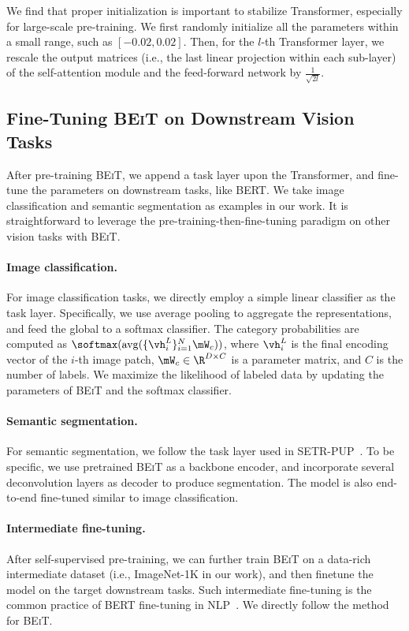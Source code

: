 \documentclass{article}
\newcommand\our{\textsc{BEiT}}
\begin{document}
We find that proper initialization is important to stabilize Transformer, especially for large-scale pre-training.
We first randomly initialize all the parameters within a small range, such as $[-0.02, 0.02]$.
Then, for the $l$-th Transformer layer, we rescale the output matrices (i.e., the last linear projection within each sub-layer) of the self-attention module and the feed-forward network by $\frac{1}{\sqrt{2l}}$.


\subsection{Fine-Tuning \our{} on Downstream Vision Tasks}
\label{sec:ft}

After pre-training \our{}, we append a task layer upon the Transformer, and fine-tune the parameters on downstream tasks, like BERT.
We take image classification and semantic segmentation as examples in our work.
It is straightforward to leverage the pre-training-then-fine-tuning paradigm on other vision tasks with \our{}.

\paragraph{Image classification.}
For image classification tasks, we directly employ a simple linear classifier as the task layer.
Specifically, we use average pooling to aggregate the representations, and feed the global to a softmax classifier.
The category probabilities are computed as $\softmax( \mathrm{avg}( \{\vh^L_i\}_{i=1}^{N} \mW_{c} ))$, where $\vh^L_i$ is the final encoding vector of the $i$-th image patch, $\mW_{c} \in \R^{D \times C}$ is a parameter matrix, and $C$ is the number of labels.
We maximize the likelihood of labeled data by updating the parameters of \our{} and the softmax classifier.

\paragraph{Semantic segmentation.}
For semantic segmentation, we follow the task layer used in SETR-PUP~\citep{setr}.
To be specific, we use pretrained \our{} as a backbone encoder, and incorporate several deconvolution layers as decoder to produce segmentation.
The model is also end-to-end fine-tuned similar to image classification.

\paragraph{Intermediate fine-tuning.}
After self-supervised pre-training, we can further train \our{} on a data-rich intermediate dataset (i.e., ImageNet-1K in our work), and then finetune the model on the target downstream tasks.
Such intermediate fine-tuning is the common practice of BERT fine-tuning in NLP~\citep{intermediate:ft}. We directly follow the method for \our{}.
\end{document}
